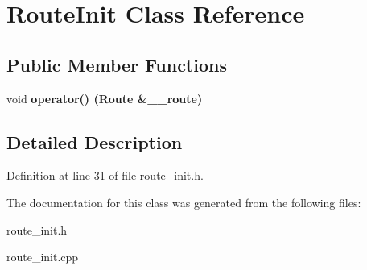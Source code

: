 \section{Route\-Init Class Reference}
\label{class_route_init}
\subsection*{Public Member Functions}
\begin{CompactItemize}
\item 
void \bf{operator()} (Route \&\_\-\_\-route)\label{class_route_init_b65a7137e114458faadb6a5510c001f7}

\end{CompactItemize}


\subsection{Detailed Description}




Definition at line 31 of file route\_\-init.h.

The documentation for this class was generated from the following files:\begin{CompactItemize}
\item 
route\_\-init.h\item 
route\_\-init.cpp\end{CompactItemize}
